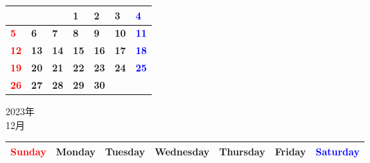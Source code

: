 \documentclass[a4paper,landscape]{jsarticle}
\newcommand{\dig}{\hspace{29mm}}
\newcommand{\tdig}{\hspace{27mm}}
\newcommand{\LBF}{\LARGE\textbf}
\begin{document}
\begingroup
\renewcommand{\arraystretch}{4}
\begin{tabular}{|p{32mm}|p{32mm}|p{32mm}|p{32mm}|p{32mm}|p{32mm}|p{32mm}|}
\hline
&&&\raisebox{30pt} {\dig\LBF{1}}&\raisebox{30pt} {\dig\LBF{2}}&\raisebox{30pt} {\dig\LBF{3}}&\raisebox{30pt} {\dig\textcolor{blue}{\LBF{4}}}\\
\hline
\raisebox{30pt} {\dig\textcolor{red}{\LBF{5}}}&\raisebox{30pt} {\dig\LBF{6}}&\raisebox{30pt} {\dig\LBF{7}}&\raisebox{30pt} {\dig\LBF{8}}&\raisebox{30pt} {\dig\LBF{9}}&\raisebox{30pt} {\tdig\LBF{10}}&\raisebox{30pt} {\tdig\textcolor{blue}{\LBF{11}}}\\
\hline
\raisebox{30pt} {\tdig\textcolor{red}{\LBF{12}}}&\raisebox{30pt} {\tdig\LBF{13}}&\raisebox{30pt} {\tdig\LBF{14}}&\raisebox{30pt} {\tdig\LBF{15}}&\raisebox{30pt} {\tdig\LBF{16}}&\raisebox{30pt} {\tdig\LBF{17}}&\raisebox{30pt} {\tdig\textcolor{blue}{\LBF{18}}}\\
\hline
\raisebox{30pt} {\tdig\textcolor{red}{\LBF{19}}}&\raisebox{30pt} {\tdig\LBF{20}}&\raisebox{30pt} {\tdig\LBF{21}}&\raisebox{30pt} {\tdig\LBF{22}}&\raisebox{30pt} {\tdig\LBF{23}}&\raisebox{30pt} {\tdig\LBF{24}}&\raisebox{30pt} {\tdig\textcolor{blue}{\LBF{25}}}\\
\hline
\raisebox{30pt} {\tdig\textcolor{red}{\LBF{26}}}&\raisebox{30pt} {\tdig\LBF{27}}&\raisebox{30pt} {\tdig\LBF{28}}&\raisebox{30pt} {\tdig\LBF{29}}&\raisebox{30pt} {\tdig\LBF{30}}&&\\
\hline
\end{tabular}
\endgroup

\newpage

\begin{center}
	\LARGE 2023年\\
	\LARGE 12月
\end{center}

\begingroup
\renewcommand{\arraystretch}{1.4}
\begin{tabular}{|>{\centering\arraybackslash}p{32mm}|>{\centering\arraybackslash}p{32mm}|>{\centering\arraybackslash}p{32mm}|>{\centering\arraybackslash}p{32mm}|>{\centering\arraybackslash}p{32mm}|>{\centering\arraybackslash}p{32mm}|>{\centering\arraybackslash}p{32mm}|}
\hline
\textcolor{red}{\large Sunday}&\large Monday&\large Tuesday&\large Wednesday&\large Thursday&\large Friday&\textcolor{blue}{\large Saturday}\\
\hline
\end{tabular}
\endgroup
\end{document}
